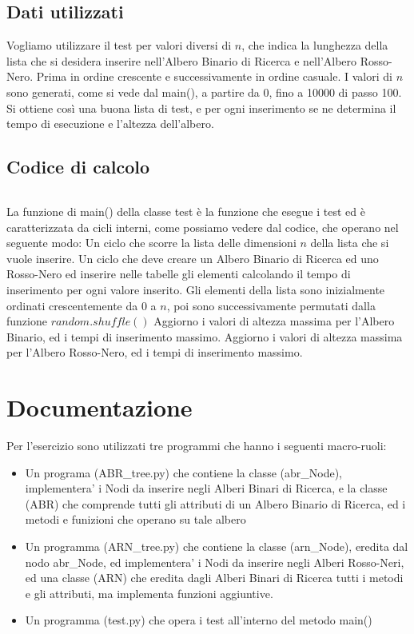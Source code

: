 \documentclass{article}
\begin{document}
\subsection{Dati utilizzati}
Vogliamo utilizzare il test per valori diversi di $n$, che indica la lunghezza della lista che si desidera inserire nell'Albero Binario di Ricerca e nell'Albero Rosso-Nero. 
Prima in ordine crescente e successivamente in ordine casuale.
I valori di $n$ sono generati, come si vede dal main(), a partire da 0, fino a 10000 di passo 100. Si ottiene così una buona lista di test, e per ogni inserimento se ne determina il tempo di esecuzione e l'altezza dell'albero. 

\subsection{Codice di calcolo}
\inputminted{python}{python.py}
La funzione di main() della classe test è la funzione che esegue i test ed è caratterizzata da cicli interni, come possiamo vedere dal codice, che operano nel seguente modo:
Un ciclo che scorre la lista delle dimensioni $n$ della lista che si vuole inserire.
Un ciclo che deve creare un Albero Binario di Ricerca ed uno Rosso-Nero  ed inserire nelle tabelle gli elementi calcolando il tempo di inserimento per ogni valore inserito.
Gli elementi della lista sono inizialmente ordinati crescentemente da 0 a $n$, poi sono successivamente permutati dalla funzione $random.shuffle()$
Aggiorno i valori di altezza massima per l'Albero Binario, ed i tempi di inserimento massimo.
Aggiorno i valori di altezza massima per l'Albero Rosso-Nero, ed i tempi di inserimento massimo.

\newpage
\section{Documentazione}
Per l’esercizio sono utilizzati tre programmi che hanno i seguenti macro-ruoli:
\begin{itemize}
\item Un programa (ABR\_tree.py) che contiene la classe (abr\_Node), implementera' i Nodi da inserire negli Alberi Binari di Ricerca, e la classe (ABR) che comprende tutti gli attributi di un Albero Binario di Ricerca, ed i metodi e funizioni che operano su tale albero
\item Un programma (ARN\_tree.py) che contiene la classe (arn\_Node), eredita dal nodo abr\_Node, ed implementera' i Nodi da inserire negli Alberi Rosso-Neri, ed una classe (ARN) che eredita dagli Alberi Binari di Ricerca tutti i metodi e gli attributi, ma implementa funzioni aggiuntive.
\item Un programma (test.py) che opera i test all'interno del metodo main()
\end{itemize}
\end{document}
